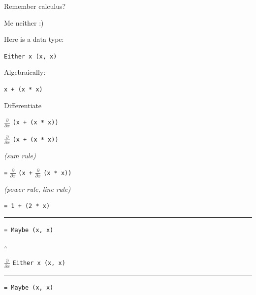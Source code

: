\begin{frame}
\begin{center}
Remember calculus?
\end{center}
\end{frame}


\begin{frame}
\begin{center}
Me neither :)
\end{center}
\end{frame}


\begin{frame}
\begin{center}
Here is a data type:

\lstinline{Either x (x, x)}
\end{center}
\end{frame}


\begin{frame}
\begin{center}
Algebraically:

\lstinline{x + (x * x)}
\end{center}
\end{frame}


\begin{frame}
\begin{center}
Differentiate

$\frac{\partial}{\partial x}$ \lstinline{(x + (x * x))}
\end{center}
\end{frame}


\begin{frame}
\begin{center}
$\frac{\partial}{\partial x}$ \lstinline{(x + (x * x))}

\tiny{\emph{(sum rule)}}\normalsize{}

\lstinline{=} $\frac{\partial}{\partial x}$ \lstinline{(x +} $\frac{\partial}{\partial x}$ \lstinline{(x * x))}

\tiny{\emph{(power rule, line rule)}}\normalsize{}

\lstinline{= 1 + (2 * x)}

\par\noindent\rule{\textwidth}{0.4pt}

\lstinline{= Maybe (x, x)}
\end{center}
\end{frame}


\begin{frame}
\begin{block}{$\therefore$}
\begin{center}
$\frac{\partial}{\partial x}$ \lstinline{Either x (x, x)}

\par\noindent\rule{\textwidth}{0.4pt}

\lstinline{= Maybe (x, x)}
\end{center}
\end{block}
\end{frame}



